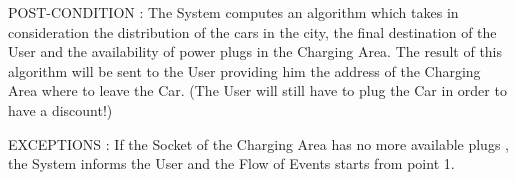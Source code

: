 \documentclass[12pt]{article}
\begin{document}
POST-CONDITION :  
The System computes an algorithm which takes in consideration the distribution of the cars in the city, the final destination of the User and the availability of power plugs in the Charging Area. The result of this algorithm will be sent to the User providing him the address of the Charging Area where to leave the Car. 
(The User will still have to plug the Car in order to have a discount!)

EXCEPTIONS : 
If the Socket of the Charging Area has no more available plugs , the System informs the User and the Flow of Events starts from point 1.
\end{document}
